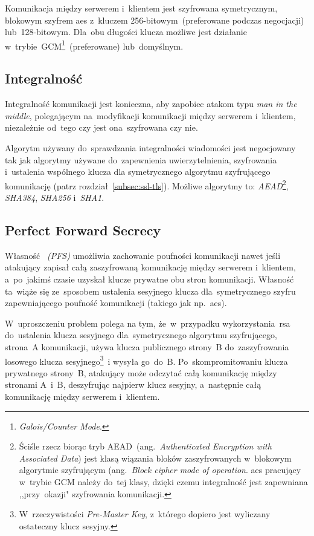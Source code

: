 \documentclass[thesis]{subfiles}
\begin{document}
Komunikacja między serwerem i~klientem jest szyfrowana symetrycznym, blokowym szyfrem \gls{aes} z~kluczem 256-bitowym~(preferowane podczas negocjacji) lub~128-bitowym. Dla~obu długości klucza możliwe jest działanie w~trybie~GCM\footnote{\emph{Galois/Counter Mode}.}~(preferowane) lub~domyślnym.


\subsection{Integralność}

Integralność komunikacji jest konieczna, aby zapobiec atakom typu \emph{man in the middle}, polegającym na~modyfikacji komunikacji między serwerem i~klientem, niezależnie od~tego czy jest ona~szyfrowana czy nie.

Algorytm używany do~sprawdzania integralności wiadomości jest negocjowany tak jak algorytmy używane do~zapewnienia uwierzytelnienia, szyfrowania i~ustalenia wspólnego klucza dla symetrycznego algorytmu szyfrującego komunikację (patrz rozdział~\ref{subsec:ssl-tls}). Możliwe algorytmy to: \emph{AEAD}\footnote{Ściśle rzecz biorąc tryb AEAD~(ang.~\emph{Authenticated Encryption with Associated Data}) jest klasą wiązania bloków zaszyfrowanych w~blokowym algorytmie szyfrującym (ang.~\emph{Block cipher mode of operation}. \gls{aes} pracujący w~trybie GCM należy do~tej klasy, dzięki czemu integralność jest zapewniana ,,przy~okazji" szyfrowania komunikacji.}, \emph{SHA384}, \emph{SHA256} i~\emph{SHA1}.


\subsection{Perfect Forward Secrecy}
\label{subsec:pfs}

Własność \emph{~(PFS)} umożliwia zachowanie poufności komunikacji nawet jeśli atakujący zapisał całą zaszyfrowaną komunikację między serwerem i~klientem, a~po~jakimś czasie uzyskał klucze prywatne obu stron komunikacji. Własność ta~wiąże się ze~sposobem ustalenia sesyjnego klucza dla~symetrycznego szyfru zapewniającego poufność komunikacji (takiego jak np.~\gls{aes}).

W~uproszczeniu problem polega na tym, że~w~przypadku wykorzystania~\gls{rsa} do~ustalenia klucza sesyjnego dla~symetrycznego algorytmu szyfrującego, strona~A komunikacji, używa klucza publicznego strony~B do~zaszyfrowania losowego klucza sesyjnego\footnote{W~rzeczywistości \emph{Pre-Master Key}, z~którego dopiero jest wyliczany ostateczny klucz sesyjny.}~i wysyła go~do~B. Po~skompromitowaniu klucza prywatnego strony~B, atakujący może odczytać całą komunikację między stronami A~i~B, deszyfrując najpierw klucz sesyjny, a~następnie całą komunikację między serwerem i~klientem.
\end{document}
